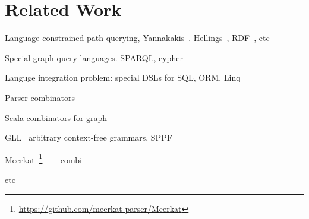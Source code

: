 \section{Related Work}

Language-constrained path querying, Yannakakis~\cite{Yannakakis}. 
Hellings~\cite{ConjCFPathQuery, Hellings16}, RDF~\cite{CFGonRDF}, etc

Special graph query languages. SPARQL, cypher

Languge integration problem: special DSLs for SQL, ORM, Linq

Parser-combinators

Scala combinators for graph~\cite{ScalaGraphParsing}

GLL~\cite{scott2010gll} arbitrary context-free grammars, SPPF~\cite{SPPF}

Meerkat~\footnote{\url{https://github.com/meerkat-parser/Meerkat}}~\cite{Meerkat} --- combi

etc

